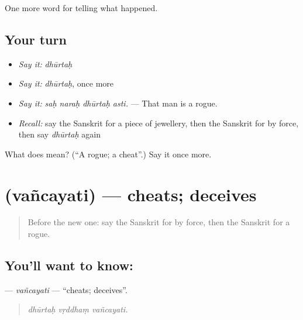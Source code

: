 \begin{grammarlens}[title={What you've built}]
One more word for telling what happened.
\end{grammarlens}

\subsection*{Your turn}
\begin{itemize}
\raggedright
  \item \emph{Say it:} \emph{dhūrtaḥ}
  \item \emph{Say it:} \emph{dhūrtaḥ}, once more
  \item \emph{Say it:} \emph{saḥ naraḥ dhūrtaḥ asti.} — That man is a rogue.
  \item \emph{Recall:} say the Sanskrit for a piece of jewellery, then the Sanskrit for by force, then say \emph{dhūrtaḥ} again
\end{itemize}

\begin{tcolorbox}[breakable,colback=teal!4,colframe=teal!35!black,title={Before you move on}]
What does  mean? (\textquotedblleft{}A rogue; a cheat\textquotedblright{}.) Say it once more.
\end{tcolorbox}
\section[\texorpdfstring{\sk{वञ्चयति} (vañcayati)}{वञ्चयति (vañcayati)}]{ (vañcayati) — cheats; deceives}

\label{lesson:SA-C291-vancayati}



\begin{quote}
Before the new one: say the Sanskrit for by force, then the Sanskrit for a rogue.
\end{quote}

\subsection*{You'll want to know: }
\textbf{} — \emph{vañcayati} — \textquotedblleft{}cheats; deceives\textquotedblright{}.

\begin{quote}
  
\end{quote}

\begin{quote}
\emph{dhūrtaḥ vṛddhaṃ vañcayati.}
\end{quote}

